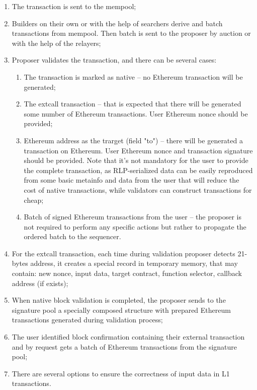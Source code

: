 \begin{enumerate}
    \item The transaction is sent to the mempool;
    \item Builders on their own or with the help of searchers derive and batch transactions 
    from mempool. Then batch is sent to the proposer by auction or with the help of 
    the relayers;
    \item Proposer validates the transaction, and there can be several cases:
        \begin{enumerate}
            \item The transaction is marked as native -- no Ethereum transaction will be generated;
            \item The extcall transaction -- that is expected that there will be generated 
            some number of Ethereum transactions. User Ethereum nonce should be provided;
            \item Ethereum address as the trarget (field "to") -- there will be generated a 
            transaction on Ethereum. User Ethereum nonce and transaction signature should be 
            provided. Note that it's not mandatory for the user to provide the complete 
            transaction, as RLP-serialized data can be easily reproduced from some basic 
            metainfo and data from the user that will reduce the cost of native transactions, 
            while validators can construct transactions for cheap; 
            \item Batch of signed Ethereum transactions from the user -- the proposer is not 
            required to perform any specific actions but rather to propagate the ordered batch 
            to the sequencer.
        \end{enumerate}
    \item For the extcall transaction, each time during validation proposer detects 21-bytes 
    address, it creates a special record in temporary memory, that may
    contain: new nonce, input data, target contract, function selector, callback address 
    (if exists);
    \item When native block validation is completed, the proposer sends to the signature pool a 
    specially composed structure with prepared Ethereum transactions generated during validation 
    process;
    \item The user identified block confirmation containing their external transaction and by 
    request gets a batch of Ethereum transactions from the signature pool;
    \item There are several options to ensure the correctness of input data in L1 transactions. 

\end{enumerate}
